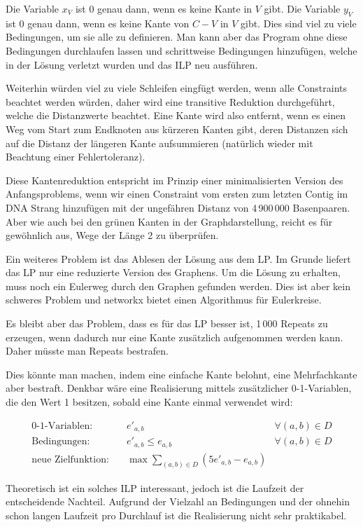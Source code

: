 Die Variable $x_V$ ist 0 genau dann, wenn es keine Kante in $V$ gibt. Die Variable $y_V$ ist 0 genau dann, wenn es keine Kante von $C-V$ in $V$ gibt.
Dies sind viel zu viele Bedingungen, um sie alle zu definieren. Man kann aber das Program ohne diese Bedingungen durchlaufen lassen und schrittweise Bedingungen hinzufügen, welche in der Lösung verletzt wurden und das ILP neu ausführen.

Weiterhin würden viel zu viele Schleifen eingfügt werden, wenn alle Constraints beachtet werden würden, daher wird eine transitive Reduktion durchgeführt, welche die Distanzwerte beachtet. Eine Kante wird also entfernt, wenn es einen Weg vom Start zum Endknoten aus kürzeren Kanten gibt, deren Distanzen sich auf die Distanz der längeren Kante aufsummieren (natürlich wieder mit Beachtung einer Fehlertoleranz).

Diese Kantenreduktion entspricht im Prinzip einer minimalisierten Version des Anfangsproblems, wenn wir einen Constraint vom ersten zum letzten Contig im DNA Strang hinzufügen mit der ungefähren Distanz von 4\,900\,000 Basenpaaren. Aber wie auch bei den grünen Kanten in der Graphdarstellung, reicht es für gewöhnlich aus, Wege der Länge 2 zu überprüfen.

Ein weiteres Problem ist das Ablesen der Lösung aus dem LP. Im Grunde liefert das LP nur eine reduzierte Version des Graphens. Um die Lösung zu erhalten, muss noch ein Eulerweg durch den Graphen gefunden werden. Dies ist aber kein schweres Problem und networkx bietet einen Algorithmus für Eulerkreise.

Es bleibt aber das Problem, dass es für das LP besser ist, 1\,000 Repeats zu erzeugen, wenn dadurch nur eine Kante zusätzlich aufgenommen werden kann. Daher müsste man Repeats bestrafen. 

Dies könnte man machen, indem eine einfache Kante belohnt, eine Mehrfachkante aber bestraft. Denkbar wäre eine Realisierung mittels zusätzlicher 0-1-Variablen, die den Wert 1 besitzen, sobald eine Kante einmal verwendet wird:

\begin{align*}
\text{0-1-Variablen:}\quad& e'_{a,b} &\forall (a,b) \in D\\
\text{Bedingungen:}\quad& e'_{a,b} \leq e_{a,b}&\forall (a,b) \in D\\
\text{neue Zielfunktion:}\quad& \max \sum_{(a,b) \in D} (5 e'_{a,b} - e_{a,b})
\end{align*}

Theoretisch ist ein solches ILP interessant, jedoch ist die Laufzeit der entscheidende Nachteil. Aufgrund der Vielzahl an Bedingungen und der ohnehin schon langen Laufzeit pro Durchlauf ist die Realisierung nicht sehr praktikabel.
